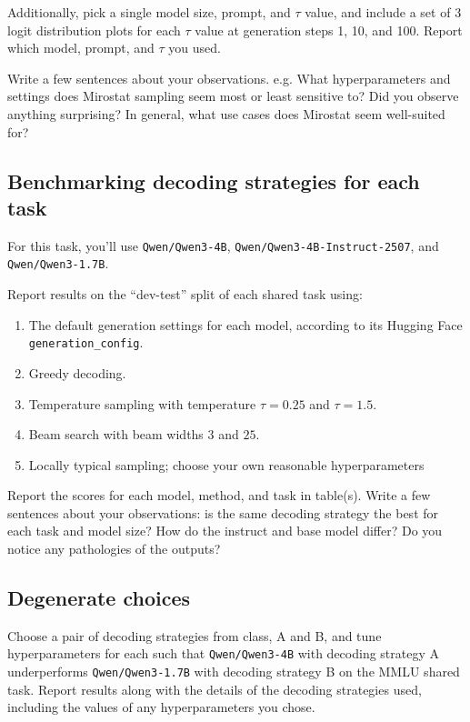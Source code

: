 \documentclass{article}
\begin{document}
Additionally, pick a single model size, prompt, and $\tau$ value, and include a set of 3 logit distribution plots for each $\tau$ value at generation steps 1, 10, and 100. Report which model, prompt, and $\tau$ you used.

Write a few sentences about your observations. e.g. What hyperparameters and settings does Mirostat sampling seem most or least sensitive to? Did you observe anything surprising? In general, what use cases does Mirostat seem well-suited for?

\subsection{Benchmarking decoding strategies for each task}

For this task, you'll use \texttt{Qwen/Qwen3-4B}, \texttt{Qwen/Qwen3-4B-Instruct-2507}, and \texttt{Qwen/Qwen3-1.7B}. 

Report results on the ``dev-test'' split of each shared task using:
\begin{enumerate}
    \item The default generation settings for each model, according to its Hugging Face \texttt{generation\_config}.
    \item Greedy decoding.
    \item Temperature sampling with temperature $\tau = 0.25$ and $\tau = 1.5$.
    \item Beam search with beam widths $3$ and $25$.
    \item Locally typical sampling; choose your own reasonable hyperparameters    
\end{enumerate}

Report the scores for each model, method, and task in table(s). Write a few sentences about your observations: is the same decoding strategy the best for each task and model size? How do the instruct and base model differ? Do you notice any pathologies of the outputs? 

\subsection{Degenerate choices}
Choose a pair of decoding strategies from class, A and B, and tune hyperparameters for each such that \texttt{Qwen/Qwen3-4B} with decoding strategy A underperforms 
\texttt{Qwen/Qwen3-1.7B} with decoding strategy B on the MMLU shared task. Report results along with the details of the decoding strategies used, including the values of any hyperparameters you chose. 


\clearpage


\end{document}
